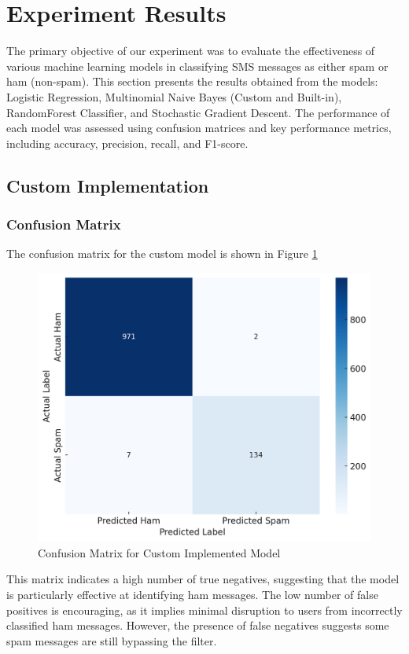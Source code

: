 \documentclass[12pt]{article}
\begin{document}
\section{Experiment Results}

The primary objective of our experiment was to evaluate the effectiveness of various machine learning models in classifying SMS messages as either spam or ham (non-spam). This section presents the results obtained from the models: Logistic Regression, Multinomial Naive Bayes (Custom and Built-in), RandomForest Classifier, and Stochastic Gradient Descent. The performance of each model was assessed using confusion matrices and key performance metrics, including accuracy, precision, recall, and F1-score.

\subsection{Custom Implementation}
\subsubsection{Confusion Matrix}
The confusion matrix for the custom model is shown in Figure \ref{fig:custom-matrix}\\
    \begin{figure}[!htbp]
        \centering
        \includegraphics[width=0.77\linewidth]{matrix.png}
        \caption{Confusion Matrix for Custom Implemented Model}
        \label{fig:custom-matrix}
    \end{figure}

This matrix indicates a high number of true negatives, suggesting that the model is particularly effective at identifying ham messages. The low number of false positives is encouraging, as it implies minimal disruption to users from incorrectly classified ham messages. However, the presence of false negatives suggests some spam messages are still bypassing the filter.
\\
\end{document}
